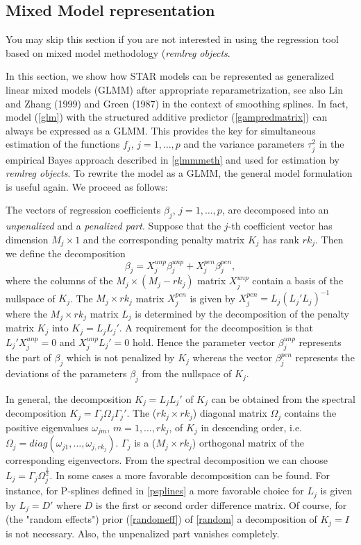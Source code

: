 \documentclass[11pt,a4paper,twoside]{bayesxarticle}
\begin{document}
\subsection{Mixed Model representation}
\label{glmmrep}

You may skip this section if you are not interested in using the
regression tool based on mixed model methodology ({\em remlreg
objects}.

In this section, we show how STAR models can be represented as
generalized linear mixed models (GLMM) after appropriate
reparametrization, see also Lin and Zhang (1999) and Green (1987)
in the context of smoothing splines. In fact, model (\ref{glm})
with the structured additive predictor (\ref{gampredmatrix}) can
always be expressed as a GLMM. This provides the key for
simultaneous estimation of the functions $f_j$, $j=1,\dots,p$ and
the variance parameters $\tau^2_j$ in the empirical Bayes approach
described in \autoref{glmmmeth} and used for estimation by {\em
remlreg objects}.  To rewrite the model as a GLMM, the general
model formulation is useful again. We proceed as follows:

The  vectors of regression coefficients $\beta_j$, $j=1,\dots,p$,
are decomposed into an {\em unpenalized} and a {\em penalized
part}. Suppose that the $j$-th coefficient vector has dimension
$M_j \times 1$ and the corresponding penalty matrix $K_j$ has rank
$rk_j$. Then we define the decomposition
\begin{equation}
\label{decompbeta} \beta_j = X_j^{unp} \beta_j^{unp} + X_j^{pen}
\beta_j^{pen},
\end{equation}
where the columns of the $M_j \times (M_j - rk_j)$ matrix
$X_j^{unp}$ contain a basis of the nullspace of $K_j$. The  $M_j
\times rk_j$ matrix $X_j^{pen}$ is given by $X_j^{pen} =
L_j(L_j'L_j)^{-1}$ where the $M_j \times rk_j$ matrix $L_j$ is
determined by the decomposition of the penalty matrix $K_j$ into
$K_j = L_jL_j'$. A requirement for the decomposition is that
$L_j'X_j^{unp} = 0$ and $X_j^{unp}L_j' = 0$ hold. Hence the
parameter vector $\beta_j^{unp}$ represents the part of $\beta_j$
which is not penalized by $K_j$ whereas the vector $\beta_j^{pen}$
represents the deviations of the parameters $\beta_j$ from the
nullspace of $K_j$.

In general, the decomposition $K_j=L_jL_j'$ of $K_j$ can be
obtained from the spectral decomposition $K_j = \Gamma_j \Omega_j
\Gamma_j'$. The ($rk_j \times rk_j$)  diagonal matrix $\Omega_j$
contains the positive eigenvalues $\omega_{jm}$, $m=1,\dots,rk_j$,
of $K_j$ in descending order, i.e. $\Omega_j =
diag(\omega_{j1},\dots,\omega_{j,rk_j})$. $\Gamma_j$ is a ($M_j
\times rk_j$) orthogonal matrix of the corresponding eigenvectors.
From the spectral decomposition we can choose $L_j = \Gamma_j
\Omega_j^{\frac{1}{2}}$. In some cases a more favorable
decomposition can be found. For instance, for P-splines defined in
\autoref{psplines} a more favorable choice for $L_j$ is given by
$L_j = D'$ where $D$ is the first or second order difference
matrix. Of course, for (the "random effects") prior
(\ref{randomeff}) of \autoref{random} a decomposition of $K_j=I$
is not necessary. Also, the unpenalized part vanishes completely.
\end{document}
